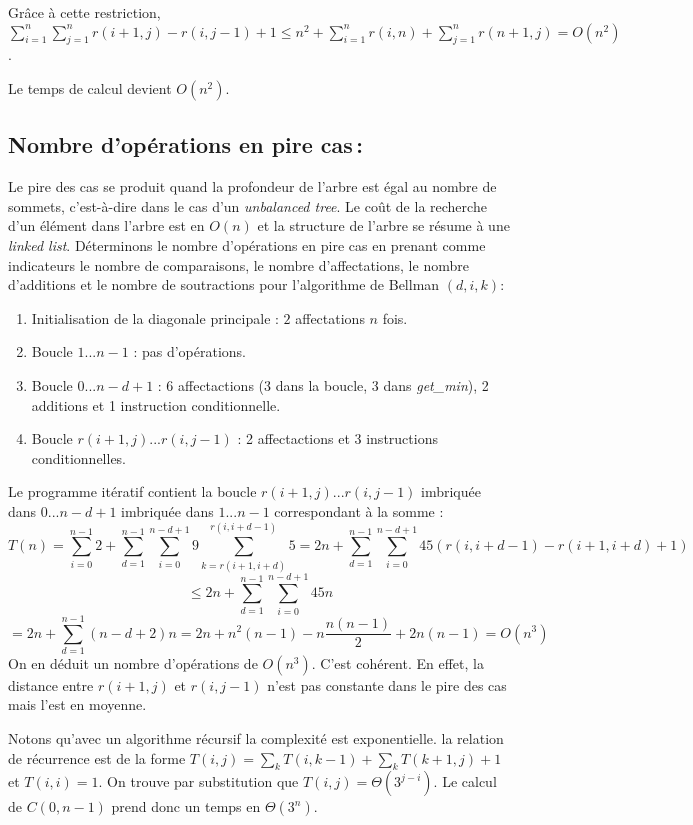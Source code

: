 \documentclass[a4paper, 10pt, french]{article}
\begin{document}
Grâce à cette restriction, $\sum \limits_{i = 1}^{n} \sum \limits_{j = 1}^{n} r(i + 1, j) - r(i, j - 1) + 1 \leq n^2 + \sum \limits_{i = 1}^{n} r(i, n) + \sum \limits_{j = 1}^{n} r(n + 1, j) = O(n^2)$.

Le temps de calcul devient $O(n^2)$.
\subsection{Nombre  d'opérations en pire cas\,: }
Le pire des cas se produit quand la profondeur de l'arbre est égal au nombre de sommets, c'est-à-dire dans le cas d'un {\em unbalanced tree}. Le coût de la recherche d'un élément dans l'arbre est en $O(n)$ et la structure de l'arbre se résume à une {\em linked list}.
Déterminons le nombre d'opérations en pire cas en prenant comme indicateurs le nombre de comparaisons, le nombre d'affectations, le nombre d'additions et le nombre de soutractions pour l'algorithme de Bellman $(d, i, k)$:
\begin{enumerate}
  \item Initialisation de la diagonale principale : $2$ affectations $n$ fois.
  \item Boucle $1...n - 1$ : pas d'opérations.
  \item Boucle $0...n - d + 1$ : 6 affectactions (3 dans la boucle, 3 dans {\em get\_min}), 2 additions et 1 instruction conditionnelle.
  \item Boucle $r(i + 1, j)...r(i, j - 1)$ : 2 affectactions et 3 instructions conditionnelles.
\end{enumerate}
Le programme itératif contient la boucle $r(i + 1, j)...r(i, j - 1)$ imbriquée dans $0...n - d + 1$ imbriquée dans $1...n - 1$ correspondant à la somme :
$$T(n) = \sum_{i=0}^{n - 1} 2 + \sum_{d=1}^{n - 1} \sum_{i = 0}^{n - d + 1} 9\sum_{k=r(i + 1, i + d)}^{r(i, i + d - 1)} 5 = 2n + \sum_{d=1}^{n - 1} \sum_{i = 0}^{n - d + 1} 45 (r(i, i + d - 1) - r(i + 1, i + d) + 1)$$
$$\leq 2n + \sum_{d=1}^{n - 1} \sum_{i = 0}^{n - d + 1} 45n$$%
$$= 2n + \sum_{d=1}^{n - 1} (n - d + 2)n = 2n + n^2(n - 1) -n\frac{n(n - 1)}{2} + 2n(n - 1) = O(n^3)$$
On en déduit un nombre d'opérations de $O(n^3)$. C'est cohérent. En effet, la distance entre $r(i + 1, j)$ et $r(i, j - 1)$ n'est pas constante dans le pire des cas mais l'est en moyenne.

Notons qu'avec un algorithme récursif la complexité est exponentielle. la relation de récurrence est de la forme $T(i, j) = \sum_k T(i, k - 1) + \sum_k T(k + 1, j) + 1$ et $T(i, i) = 1$. On trouve par substitution que $T(i, j) = \Theta(3^{j - i})$. Le calcul de $C(0, n - 1)$ prend donc un temps en $\Theta(3^n)$.
\end{document}
